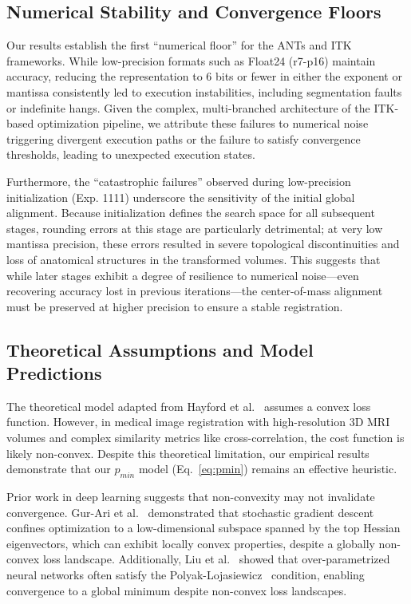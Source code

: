 \documentclass[journal,twoside,web]{ieeecolor}
\begin{document}
\subsection{Numerical Stability and Convergence Floors}
Our results establish the first ``numerical floor'' for the ANTs and ITK frameworks. While low-precision formats such as Float24 (r7-p16) maintain accuracy, reducing the representation to 6 bits or fewer in either the exponent or mantissa consistently led to execution instabilities, including segmentation faults or indefinite hangs. Given the complex, multi-branched architecture of the ITK-based optimization pipeline, we attribute these failures to numerical noise triggering divergent execution paths or the failure to satisfy convergence thresholds, leading to unexpected execution states.

Furthermore, the ``catastrophic failures'' observed during low-precision initialization (Exp. 1111) underscore the sensitivity of the initial global alignment. Because initialization defines the search space for all subsequent stages, rounding errors at this stage are particularly detrimental; at very low mantissa precision, these errors resulted in severe topological discontinuities and loss of anatomical structures in the transformed volumes. This suggests that while later stages exhibit a degree of resilience to numerical noise---even recovering accuracy lost in previous iterations---the center-of-mass alignment must be preserved at higher precision to ensure a stable registration.

\subsection{Theoretical Assumptions and Model Predictions}
The theoretical model adapted from Hayford et al.~\cite{Hayford2024-kb} assumes a convex loss function. However, in medical image registration with high-resolution 3D MRI volumes and complex similarity metrics like cross-correlation, the cost function is likely non-convex. Despite this theoretical limitation, our empirical results demonstrate that our $p_{min}$ model (Eq.~\ref{eq:pmin}) remains an effective heuristic.

Prior work in deep learning suggests that non-convexity may not invalidate convergence. Gur-Ari et al.~\cite{Gur-Ari2018-pm} demonstrated that stochastic gradient descent confines optimization to a low-dimensional subspace spanned by the top Hessian eigenvectors, which can exhibit locally convex properties, despite a globally non-convex loss landscape. Additionally, Liu et al.~\cite{Liu2020-pe} showed that over-parametrized neural networks often satisfy the Polyak-Lojasiewicz~\cite{Lojasiewicz1963-xd,Polyak1963-nd} condition, enabling convergence to a global minimum despite non-convex loss landscapes.
\end{document}
